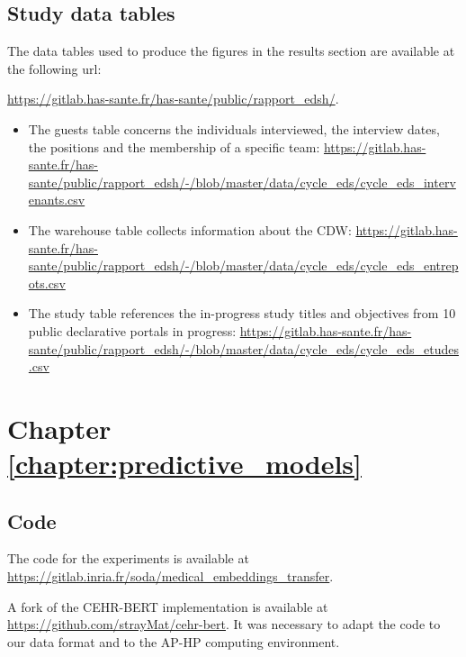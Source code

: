 \documentclass[french,12pt,twoside,a4paper]{book}
\begin{document}
\begin{appendices}
\begin{landscape}
\begin{table}[h!]
    \end{table}
  \end{landscape}

  \section{Study data tables}\label{apd:cdw:study_tables}

  The data tables used to produce the figures in the results section are available
  at the following url:

  \url{https://gitlab.has-sante.fr/has-sante/public/rapport_edsh/}.

  \begin{itemize}
    \item The guests table concerns the individuals interviewed, the interview dates, the
          positions and the membership of a specific team: \url{https://gitlab.has-sante.fr/has-sante/public/rapport_edsh/-/blob/master/data/cycle_eds/cycle_eds_intervenants.csv}
    \item  The warehouse table collects information about the CDW: \url{https://gitlab.has-sante.fr/has-sante/public/rapport_edsh/-/blob/master/data/cycle_eds/cycle_eds_entrepots.csv}
    \item The study table references the in-progress study titles and objectives from 10 public declarative portals in progress: \url{https://gitlab.has-sante.fr/has-sante/public/rapport_edsh/-/blob/master/data/cycle_eds/cycle_eds_etudes.csv}
  \end{itemize}




  \chapter{Chapter \ref{chapter:predictive_models}}\label{apd:predictive_models}

  \section{Code}

  The code for the experiments is available at
  \url{https://gitlab.inria.fr/soda/medical_embeddings_transfer}.

  A fork of the CEHR-BERT implementation is available at \url{https://github.com/strayMat/cehr-bert}. It was necessary
  to adapt the code to our data format and to the AP-HP computing environment.


\end{appendices}
\end{document}
